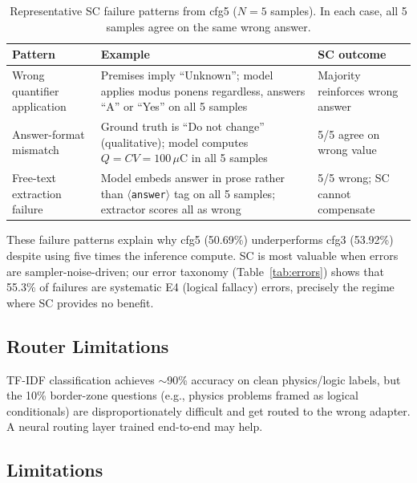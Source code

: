 \documentclass{ieeeaccess}
\begin{document}
\begin{table}[t]
  \centering
  \caption{Representative SC failure patterns from cfg5 ($N=5$ samples).
           In each case, all 5 samples agree on the same wrong answer.}
  \label{tab:sc_failures}
  \begin{tabular}{p{2.5cm}p{5.5cm}p{2.5cm}}
    \toprule
    \textbf{Pattern} & \textbf{Example} & \textbf{SC outcome} \\
    \midrule
    Wrong quantifier application
      & Premises imply ``Unknown''; model applies modus ponens regardless,
        answers ``A'' or ``Yes'' on all 5 samples
      & Majority reinforces wrong answer \\
    \addlinespace
    Answer-format mismatch
      & Ground truth is ``Do not change'' (qualitative); model computes
        $Q = CV = 100\,\mu\text{C}$ in all 5 samples
      & 5/5 agree on wrong value \\
    \addlinespace
    Free-text extraction failure
      & Model embeds answer in prose rather than
        $\langle$\texttt{answer}$\rangle$ tag on all 5 samples;
        extractor scores all as wrong
      & 5/5 wrong; SC cannot compensate \\
    \bottomrule
  \end{tabular}
\end{table}

These failure patterns explain why cfg5 (50.69\%) underperforms cfg3
(53.92\%) despite using five times the inference compute.
SC is most valuable when errors are sampler-noise-driven; our error
taxonomy (Table~\ref{tab:errors}) shows that 55.3\% of failures are
systematic E4 (logical fallacy) errors, precisely the regime where SC
provides no benefit.


\subsection{Router Limitations}

TF-IDF classification achieves $\sim$90\% accuracy on clean physics/logic
labels, but the 10\% border-zone questions (e.g., physics problems framed
as logical conditionals) are disproportionately difficult and get routed to
the wrong adapter. A neural routing layer trained end-to-end may help.

\subsection{Limitations}
\end{document}
